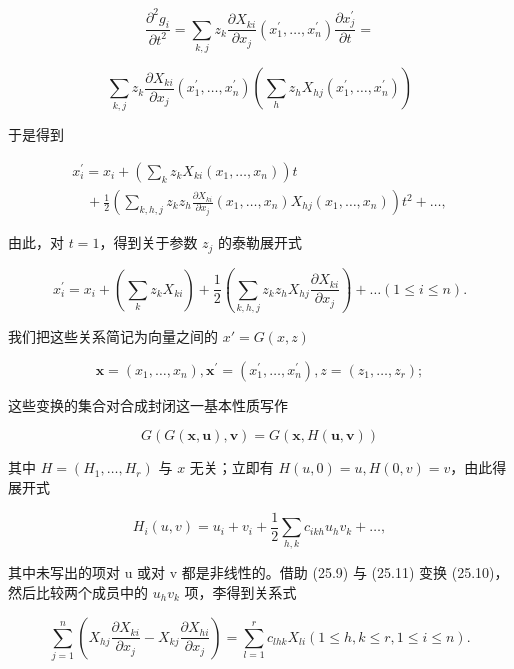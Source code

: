 \[
\frac {\partial^ {2} g _ {i}}{\partial t ^ {2}} = \sum_ {k, j} z _ {k} \frac {\partial X _ {k i}}{\partial x _ {j}} (x _ {1} ^ {\prime}, \dots , x _ {n} ^ {\prime}) \frac {\partial x _ {j} ^ {\prime}}{\partial t} =
\]

\[
\sum_ {k, j} z _ {k} \frac {\partial X _ {k i}}{\partial x _ {j}} (x _ {1} ^ {\prime}, \dots , x _ {n} ^ {\prime}) \left(\sum_ {h} z _ {h} X _ {h j} (x _ {1} ^ {\prime}, \dots , x _ {n} ^ {\prime})\right)
\]

于是得到

\[
\begin{array}{l} x _ {i} ^ {\prime} = x _ {i} + \left(\sum_ {k} z _ {k} X _ {k i} (x _ {1}, \dots , x _ {n})\right) t \\ \quad + \frac {1}{2} \left(\sum_ {k, h, j} z _ {k} z _ {h} \frac {\partial X _ {k i}}{\partial x _ {j}} (x _ {1}, \dots , x _ {n}) X _ {h j} (x _ {1}, \dots , x _ {n})\right) t ^ {2} + \dots , \end{array}
\]

由此，对 \(t = 1\)，得到关于参数 \(z_{j}\) 的泰勒展开式

\[
x _ {i} ^ {\prime} = x _ {i} + \left(\sum_ {k} z _ {k} X _ {k i}\right) + \frac {1}{2} \left(\sum_ {k, h, j} z _ {k} z _ {h} X _ {h j} \frac {\partial X _ {k i}}{\partial x _ {j}}\right) + \dots (1 \leq i \leq n).\tag{25.9}
\]

我们把这些关系简记为向量之间的 \(x' = G(x, z)\)

\[
\boldsymbol {x} = (x _ {1}, \dots , x _ {n}), \boldsymbol {x} ^ {\prime} = (x _ {1} ^ {\prime}, \dots , x _ {n} ^ {\prime}), z = (z _ {1}, \dots , z _ {r});
\]

这些变换的集合对合成封闭这一基本性质写作

\[
G (G (\boldsymbol {x}, \boldsymbol {u}), \boldsymbol {v}) = G (\boldsymbol {x}, H (\boldsymbol {u}, \boldsymbol {v}))\tag{25.10}
\]

其中 \(H = (H_{1},\ldots ,H_{r})\) 与 \(x\) 无关；立即有 \(H(u,0) = u,H(0,v) = v\)，由此得展开式

\[
H _ {i} (u, v) = u _ {i} + v _ {i} + \frac {1}{2} \sum_ {h, k} c _ {i k h} u _ {h} v _ {k} + \dots ,\tag{25.11}
\]

其中未写出的项对 u 或对 v 都是非线性的。借助 (25.9) 与 (25.11) 变换 (25.10)，然后比较两个成员中的 \(u_{h}v_{k}\) 项，李得到关系式

\[
\sum_ {j = 1} ^ {n} \left(X _ {h j} \frac {\partial X _ {k i}}{\partial x _ {j}} - X _ {k j} \frac {\partial X _ {h i}}{\partial x _ {j}}\right) = \sum_ {l = 1} ^ {r} c _ {l h k} X _ {l i} (1 \leq h, k \leq r, 1 \leq i \leq n).\tag{25.12}
\]

